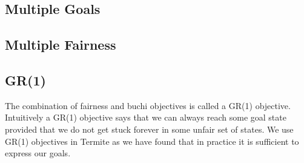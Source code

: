 \subsection{Multiple Goals}

\subsection{Multiple Fairness}

\subsection{GR(1)}

The combination of fairness and buchi objectives is called a GR(1) objective. Intuitively a GR(1) objective says that we can always reach some goal state provided that we do not get stuck forever in some unfair set of states. We use GR(1) objectives in Termite as we have found that in practice it is sufficient to express our goals.

